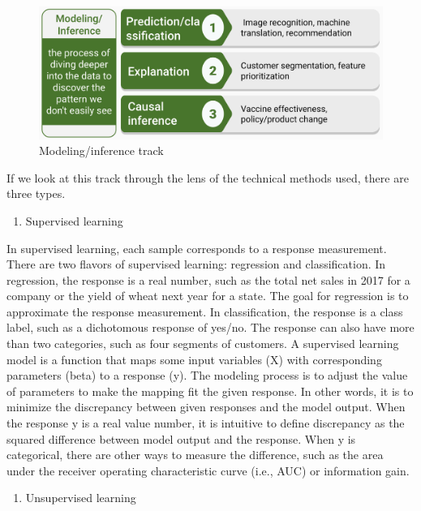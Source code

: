 \documentclass[
  12pt,
]{krantz}
\providecommand{\tightlist}{%
  \setlength{\itemsep}{0pt}\setlength{\parskip}{0pt}}
\begin{document}
\begin{figure}

{\centering \includegraphics[width=0.8\linewidth]{images/track3_modeling} 

}

\caption{Modeling/inference track}\label{fig:track3modeling}
\end{figure}

If we look at this track through the lens of the technical methods used, there are three types.

\begin{enumerate}
\def\labelenumi{(\arabic{enumi})}
\tightlist
\item
  Supervised learning
\end{enumerate}

In supervised learning, each sample corresponds to a response measurement. There are two flavors of supervised learning: regression and classification. In regression, the response is a real number, such as the total net sales in 2017 for a company or the yield of wheat next year for a state. The goal for regression is to approximate the response measurement. In classification, the response is a class label, such as a dichotomous response of yes/no. The response can also have more than two categories, such as four segments of customers. A supervised learning model is a function that maps some input variables (X) with corresponding parameters (beta) to a response (y). The modeling process is to adjust the value of parameters to make the mapping fit the given response. In other words, it is to minimize the discrepancy between given responses and the model output. When the response y is a real value number, it is intuitive to define discrepancy as the squared difference between model output and the response. When y is categorical, there are other ways to measure the difference, such as the area under the receiver operating characteristic curve (i.e., AUC) or information gain.

\begin{enumerate}
\def\labelenumi{(\arabic{enumi})}
\setcounter{enumi}{1}
\tightlist
\item
  Unsupervised learning
\end{enumerate}
\end{document}
